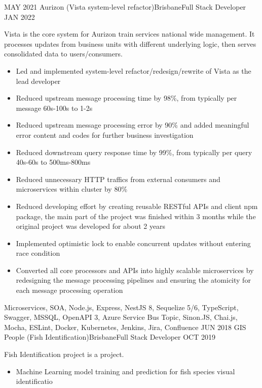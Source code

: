 \begin{experiences}
    \emptySeparator
    \experience
    {MAY 2021}   {Aurizon (Vista system-level refactor)}{Brisbane}{Full Stack Developer}
    {JAN 2022} {
                    Vista is the core system for Aurizon train services national wide management. It processes updates from business units with different underlying logic, then serves consolidated data to users/consumers.
                      \begin{itemize}
                        \item Led and implemented system-level refactor/redesign/rewrite of Vista as the lead developer
                        \item Reduced upstream message processing time by 98\%, from typically per message 60s-100s to 1-2s 
                        \item Reduced upstream message processing error by 90\% and added meaningful error content and codes for further business investigation
                        \item Reduced downstream query response time by 99\%, from typically per query 40s-60s to 500ms-800ms
                        \item Reduced unnecessary HTTP traffics from external consumers and microservices within cluster by 80\%
                        \item Reduced developing effort by creating reusable RESTful APIs and client npm package, the main part of the project was finished within 3 months while the original project was developed for about 2 years
                        \item Implemented optimistic lock to enable concurrent updates without entering race condition
                        \item Converted all core processors and APIs into highly scalable microservices by redesigning the message processing pipelines and ensuring the atomicity for each message processing operation
                      \end{itemize}
                    }
                    {Microservices, SOA, Node.js, Express, NestJS 8, Sequelize 5/6, TypeScript, Swagger, MSSQL, OpenAPI 3, Azure Service Bus Topic, Sinon.JS, Chai.js, Mocha, ESLint, Docker, Kubernetes, Jenkins, Jira, Confluence}
    \emptySeparator
    \experience
    {JUN 2018}   {GIS People (Fish Identification)}{Brisbane}{Full Stack Developer}
    {OCT 2019} {
                    Fish Identification project is a project.
                      \begin{itemize}
                        \item Machine Learning model training and prediction for fish species visual identificatio

\end{itemize}}
\end{experiences}
